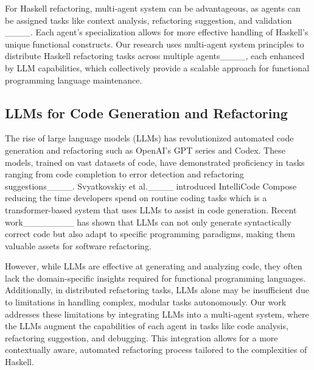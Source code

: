 
For Haskell refactoring, multi-agent system can be advantageous, as agents can be assigned tasks like context analysis, refactoring suggestion, and validation ____. Each agent’s specialization allows for more effective handling of Haskell’s unique functional constructs. Our research uses multi-agent system principles to distribute Haskell refactoring tasks across multiple agents____, each enhanced by LLM capabilities, which collectively provide a scalable approach for functional programming language maintenance.

\subsection{LLMs for Code Generation and Refactoring}

The rise of large language models (LLMs) has revolutionized automated code generation and refactoring such as OpenAI’s GPT series and Codex. These models, trained on vast datasets of code, have demonstrated proficiency in tasks ranging from code completion to error detection and refactoring suggestions____. Svyatkovskiy et al.____ introduced IntelliCode Compose reducing the time developers spend on routine coding tasks which is a transformer-based system that uses LLMs to assist in code generation. Recent work________ has shown that LLMs can not only generate syntactically correct code but also adapt to specific programming paradigms, making them valuable assets for software refactoring.

However, while LLMs are effective at generating and analyzing code, they often lack the domain-specific insights required for functional programming languages. Additionally, in distributed refactoring tasks, LLMs alone may be insufficient due to limitations in handling complex, modular tasks autonomously. Our work addresses these limitations by integrating LLMs into a multi-agent system, where the LLMs augment the capabilities of each agent in tasks like code analysis, refactoring suggestion, and debugging. This integration allows for a more contextually aware, automated refactoring process tailored to the complexities of Haskell.

